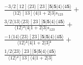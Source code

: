 \documentclass[varwidth, border=5pt]{standalone}
\begin{document}
\begin{my}
$\begin{gathered}
\scriptscriptstyle\frac{-3/2[12]⟨23⟩[23][𝟓|𝟓|4⟩⟨4𝟓⟩}{⟨12⟩[13]⟨4|1+2|3]s_{123}} +\\
\scriptscriptstyle\frac{3/2⟨13⟩⟨23⟩[23][𝟓|𝟓|4⟩⟨4𝟓⟩}{⟨12⟩²⟨4|1+2|3]s_{123}} +\\
\scriptscriptstyle\frac{-1⟨14⟩⟨23⟩[23][𝟓|𝟓|4⟩⟨4𝟓⟩}{⟨12⟩²⟨4|1+2|3]²} +\\
\scriptscriptstyle\frac{1/2⟨23⟩[23][𝟓|𝟓|4⟩⟨4𝟓⟩}{⟨12⟩²[13]⟨4|1+2|3]} \phantom{+}
\end{gathered}$
\end{my}
\end{document}
